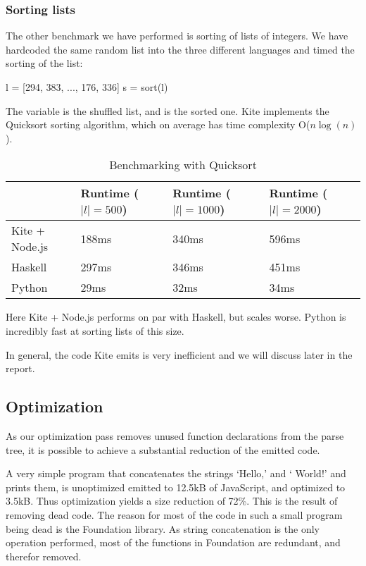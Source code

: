 \subsubsection{Sorting lists}

The other benchmark we have performed is sorting of lists of integers. We have hardcoded the same random list into the three different languages and timed the sorting of the list:

\begin{kite}
l = [294, 383, ..., 176, 336]
s = sort(l)
\end{kite}

The variable  is the shuffled list, and  is the sorted one. Kite implements the  Quicksort sorting algorithm, which on average has time complexity O($n \log(n)$).

\begin{table}[h]
  \centering
  \begin{tabular}{|l|l|l|l|}
    \hline
                   & Runtime ($|l| = 500$) & Runtime ($|l| = 1000$) & Runtime ($|l| = 2000$) \\
    \hline
    Kite + Node.js & 188ms                 & 340ms                  & 596ms                  \\
    Haskell        & 297ms                 & 346ms                  & 451ms                  \\
    Python         & 29ms                  & 32ms                   & 34ms                   \\
    \hline
  \end{tabular}
  \caption{Benchmarking with Quicksort}
\end{table}

Here Kite + Node.js performs on par with Haskell, but scales worse. Python is incredibly fast at sorting lists of this size.

In general, the code Kite emits is very inefficient and we will discuss later in the report.


\subsection{Optimization}
As our optimization pass removes unused function declarations from the parse tree, it is possible to achieve a substantial reduction of the emitted code.

A very simple program that concatenates the strings `Hello,' and ` World!' and prints them, is unoptimized emitted to 12.5kB of JavaScript, and optimized to 3.5kB. Thus optimization yields a size reduction of 72\%. This is the result of removing dead code. The reason for most of the code in such a small program being dead is the Foundation library. As string concatenation is the only operation performed, most of the functions in Foundation are redundant, and therefor removed.

